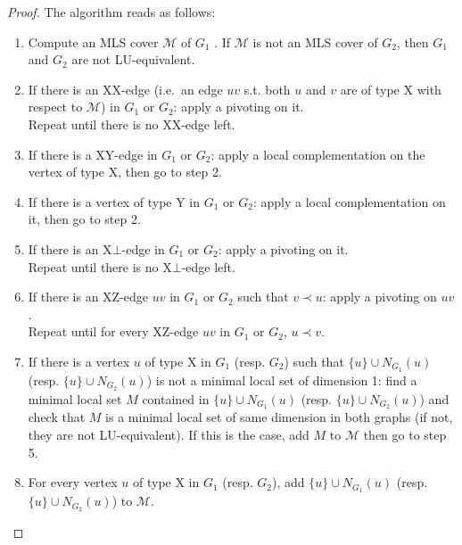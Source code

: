 \documentclass[a4paper,UKenglish,cleveref,autoref,thm-restate]{arxiv}
\begin{document}
\begin{proof}
    
    The algorithm reads as follows:

    \begin{enumerate}
        \item Compute an MLS cover $\mathcal M$ of $G_1$ \cite{claudet2024covering}. If $\mathcal M$ is not an MLS cover of $G_2$, then $G_1$ and $G_2$ are not LU-equivalent.
        \item If there is an XX-edge (i.e.~an edge $uv$ s.t. both $u$ and $v$ are of type X with respect to $\mathcal M$) in $G_1$ or $G_2$: apply a pivoting on it.\\
        Repeat until there is no XX-edge left.
        \item If there is a XY-edge in $G_1$ or $G_2$: apply a local complementation on the vertex of type X, then go to step 2.
        \item If there is a vertex of type Y in $G_1$ or $G_2$: apply a local complementation on it, then go to step 2.
        \item If there is an X$\bot$-edge in $G_1$ or $G_2$: apply a pivoting on it.\\
        Repeat until there is no X$\bot$-edge left.

        \item If there is an XZ-edge $uv$ in $G_1$ or $G_2$ such that $v\prec u$: apply a pivoting on $u v$.\\
        Repeat until for every XZ-edge $uv$ in $G_1$ or $G_2$, $u\prec v$.
 
        \item If there is a vertex $u$ of type X in $G_1$ (resp. $G_2$) such that $\{u\} \cup N_{G_1}(u)$ (resp.  $\{u\} \cup  N_{G_2}(u)$) is not a minimal local set of dimension 1: find a minimal local set $M$ contained in $\{u\} \cup N_{G_1}(u)$ (resp.  $\{u\} \cup  N_{G_2}(u)$) and check that $M$ is a minimal local set of same dimension in both graphs (if not, they are not LU-equivalent). If this is the case, add $M$ to $\mathcal M$ then go to step 5.

        \item For every vertex $u$ of type X in $G_1$ (resp. $G_2$), add $\{u\} \cup N_{G_1}(u)$ (resp.  $\{u\} \cup N_{G_2}(u)$) to $\mathcal M$.
    \end{enumerate}


\end{proof}
\end{document}
